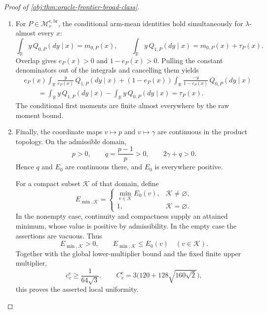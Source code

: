 \begin{proof}[Proof of \cref{obj:thm:oracle-frontier-broad-class}]
\begin{enumerate}
\item For \(P\in\mathcal M_v^{\mathrm{e,br}}\), the conditional arm-mean identities hold simultaneously for \(\lambda\)-almost every \(x\):
\[
\int_{\mathbb R}y\,Q_{0,P}(dy\mid x)=m_{0,P}(x),
\qquad
\int_{\mathbb R}y\,Q_{1,P}(dy\mid x)
=m_{0,P}(x)+\tau_P(x).
\]
Overlap gives \(e_P(x)>0\) and \(1-e_P(x)>0\). Pulling the constant denominators out of the integrals and cancelling them yields
\[
\begin{aligned}
&e_P(x)\int_{\mathbb R}\frac{y}{e_P(x)}\,Q_{1,P}(dy\mid x)
+(1-e_P(x))\int_{\mathbb R}\frac{-y}{1-e_P(x)}\,Q_{0,P}(dy\mid x)\\
&\qquad=
\int_{\mathbb R}y\,Q_{1,P}(dy\mid x)
-\int_{\mathbb R}y\,Q_{0,P}(dy\mid x)
=\tau_P(x).
\end{aligned}
\]
The conditional first moments are finite almost everywhere by the raw moment bound.

\item Finally, the coordinate maps \(v\mapsto p\) and \(v\mapsto\gamma\) are continuous in the product topology. On the admissible domain,
\[
p>0,\qquad
q=\frac{p-1}{p}>0,\qquad
2\gamma+q>0.
\]
Hence \(q\) and \(E_0\) are continuous there, and \(E_0\) is everywhere positive.

For a compact subset \(\mathcal K\) of that domain, define
\[
E_{\min,\mathcal K}
=
\begin{cases}
\displaystyle\min_{v\in\mathcal K}E_0(v),&\mathcal K\ne\varnothing,\\[1mm]
1,&\mathcal K=\varnothing.
\end{cases}
\]
In the nonempty case, continuity and compactness supply an attained minimum, whose value is positive by admissibility. In the empty case the assertions are vacuous. Thus
\[
E_{\min,\mathcal K}>0,
\qquad
E_{\min,\mathcal K}\le E_0(v)\quad(v\in\mathcal K).
\]
Together with the global lower-multiplier bound and the fixed finite upper multiplier,
\[
c_v^{\mathrm e}\ge\frac1{64\sqrt3},
\qquad
C_v^{\mathrm e}=3\bigl(120+128\sqrt{160\sqrt2}\bigr),
\]
this proves the asserted local uniformity.
\end{enumerate}
\end{proof}

